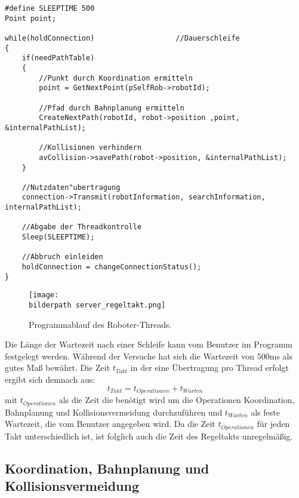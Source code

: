 \begin{lstlisting}[frame=tb,captionpos=b,caption=Thread des Regeltaktes., label=serv:lst:thread]
#define SLEEPTIME 500
Point point;

while(holdConnection) 					//Dauerschleife
{	
	if(needPathTable)
	{
		//Punkt durch Koordination ermitteln
		point = GetNextPoint(pSelfRob->robotId);
		
		//Pfad durch Bahnplanung ermitteln
		CreateNextPath(robotId, robot->position ,point, &internalPathList);
		
		//Kollisionen verhindern
		avCollision->savePath(robot->position, &internalPathList);
	} 	
	
	//Nutzdaten"ubertragung
	connection->Transmit(robotInformation, searchInformation, internalPathList);
	
	//Abgabe der Threadkontrolle
	Sleep(SLEEPTIME);
	
	//Abbruch einleiden
	holdConnection = changeConnectionStatus();
}

\end{lstlisting}


\begin{figure}[h]
	\centering	
	\texttt{[image: \\bilderpath server\_regeltakt.png]}
	\caption{Programmablauf des Roboter-Threads.}
	\label{serv:fig:regeltakt}
\end{figure}

Die Länge der Wartezeit nach einer Schleife kann vom Benutzer im Programm festgelegt werden. Während der Versuche hat sich die Wartezeit von 500ms als gutes Maß bewährt. Die Zeit $t_{Takt}$ in der eine Übertragung pro Thread erfolgt ergibt sich demnach aus: 
\begin{equation}
t_{Takt} = t_{Operationen}+t_{Warten}
\end{equation}
mit $t_{Operationen}$ als die Zeit die benötigt wird um die Operationen Koordination, Bahnplanung und Kollisionsvermeidung durchzuführen und $t_{Warten}$ als feste Wartezeit, die vom Benutzer angegeben wird. Da die Zeit $t_{Operationen}$ für jeden Takt unterschiedlich ist, ist folglich auch die Zeit des Regeltakts unregelmäßig. 

\subsection{Koordination, Bahnplanung und Kollisionsvermeidung}\label{serv:kbk}
